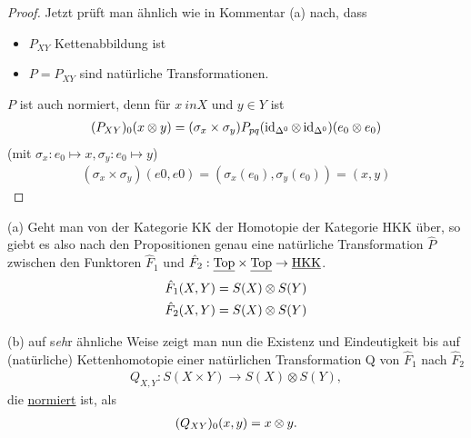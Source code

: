 \begin{proof}
	Jetzt prüft man ähnlich wie in Kommentar (a) nach, dass
	\begin{itemize}
		\item $P_{XY}$ Kettenabbildung ist
		\item $P = P_{XY}$ sind natürliche Transformationen.
	\end{itemize}
$P$ ist auch normiert, denn für $x \ in X$ und $y \in Y$ ist
\begin{align*}
(P_{XY})_0(x \otimes y) = (\sigma_x \times \sigma_y) P_{pq}(\operatorname{id}_{\Delta^0} \otimes \operatorname{id}_{\Delta^0})(e_0 \otimes e_0)
\end{align*}
(mit $\sigma_x: e_0 \mapsto x, \sigma_y : e_0 \mapsto y$)
\begin{align*}
(\sigma_x \times \sigma_y)(e0, e0) = (\sigma_x(e_0), \sigma_y(e_0)) = (x,y)
\end{align*}
\end{proof}

\begin{kommentar}
	(a) Geht man von der Kategorie KK der Homotopie der Kategorie HKK über, so giebt es also nach den Propositionen genau eine natürliche Transformation $\hat{P}$ zwischen den Funktoren $\hat{F}_1$ und $\hat{F}_2 : \textrm{\underline{Top}} \times \textrm{\underline{Top}} \rightarrow \textrm{\underline{HKK}}$.
	\begin{align*}
	\hat{F}_1(X,Y) = S(X) \otimes S(Y) \\
	\hat{F}_2(X,Y) = S(X) \otimes S(Y)
	\end{align*}
	
	(b) auf s\textit{eh\/}r ähnliche Weise zeigt man nun die Existenz und Eindeutigkeit bis auf (natürliche) Kettenhomotopie einer natürlichen Transformation Q von $\hat{F}_1$ nach $\hat{F}_2$
	\begin{align*}
	Q_{X,Y} : S(X \times Y) \rightarrow S(X) \otimes S(Y),
	\end{align*}
	die \underline{normiert} ist, als
	\begin{align*}
	(Q_{XY})_0(x,y) = x \otimes y.
	\end{align*}
\end{kommentar}